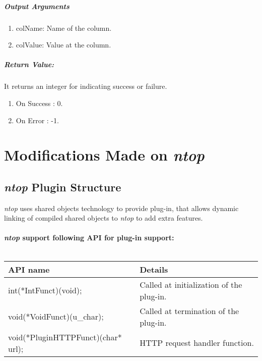 \documentclass[12 pt , a4paper ]{report}
\begin{document}
\paragraph{Output Arguments}
\begin{enumerate}
 \item colName: Name of the column.
 \item colValue: Value at the column.
\end{enumerate}

 \paragraph{Return Value:}
 It returns an integer  for indicating success or failure.
\begin{enumerate}
 \item On Success : 0.
 \item On Error   : -1.
\end{enumerate}



\chapter{Modifications Made on \emph{ntop} }

\section{\emph{ntop} Plugin Structure}
\emph{ntop} uses  shared objects technology to provide plug-in, 
that allows dynamic linking of compiled shared objects  to \emph{ntop} to add extra features. \\ \\

\textbf{\emph{ntop} support following API for plug-in support:}\\ \\
\begin{tabular}{|l|l|}
\hline
\cellcolor{blue!40} \textbf{API name} & \cellcolor{blue!40} \textbf{Details}\\
\hline
 int(*IntFunct)(void); & Called at initialization of the plug-in.\\
 \hline
 void(*VoidFunct)(u\_char); & Called at termination of the plug-in.\\
 \hline
 void(*PluginHTTPFunct)(char* url); & HTTP request handler function.\\
 \hline
\end{tabular}
\end{document}
